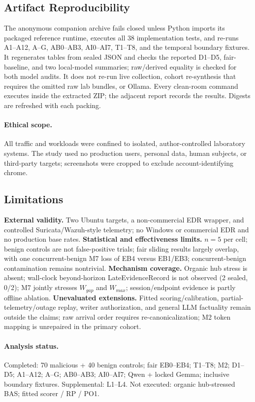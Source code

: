 \subsection{Artifact Reproducibility}
\label{sec:artifact}

The anonymous companion archive fails closed unless Python imports its packaged reference runtime,
executes all 38 implementation tests, and re-runs A1--A12, A--G, AB0--AB3, AI0--AI7, T1--T8,
and the temporal boundary fixtures. It regenerates tables from sealed JSON and checks the reported
D1--D5, fair-baseline, and two local-model summaries; raw/derived equality is checked for both
model audits. It does not re-run
live collection, cohort re-synthesis that
requires the omitted raw lab bundles, or Ollama. Every clean-room command executes inside the
extracted ZIP; the adjacent report records the results. Digests are refreshed with each packing.

\paragraph{Ethical scope.}
All traffic and workloads were confined to isolated, author-controlled laboratory systems. The
study used no production users, personal data, human subjects, or third-party targets; screenshots
were cropped to exclude account-identifying chrome.

\subsection{Limitations}
\label{sec:discussion}

\textbf{External validity.} Two Ubuntu targets, a non-commercial EDR wrapper, and controlled
Suricata/Wazuh-style telemetry; no Windows or commercial EDR and no production base rates.
\textbf{Statistical and effectiveness limits.} $n{=}5$ per cell; benign controls are not
false-positive trials; fair sliding results largely overlap, with one concurrent-benign M7 loss of
EB4 versus EB1/EB3; concurrent-benign contamination remains nontrivial.
\textbf{Mechanism coverage.} Organic hub stress is absent; wall-clock beyond-horizon
LateEvidenceRecord is not observed (2 sealed, 0/2); M7 jointly stresses $W_{gap}$ and $W_{max}$;
session/endpoint evidence is partly offline ablation.
\textbf{Unevaluated extensions.} Fitted scoring/calibration, partial-telemetry/outage replay,
writer authorization, and general LLM factuality remain outside the claims; raw arrival order
requires re-canonicalization; M2 token mapping is unrepaired in the primary cohort.

\paragraph{Analysis status.}
Completed: 70 malicious + 40 benign controls; fair EB0--EB4; T1--T8; M2; D1--D5; A1--A12; A--G;
AB0--AB3; AI0--AI7; Qwen + locked Gemma; inclusive boundary fixtures. Supplemental: L1--L4.
Not executed: organic hub-stressed BAS; fitted scorer / RP / PO1.
